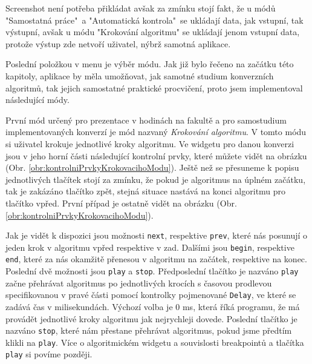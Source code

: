 Screenshot není potřeba přikládat avšak za zmínku stojí fakt, že u módů "Samostatná práce"\ a "Automatická kontrola"\ se ukládají data, jak vstupní, tak výstupní, avšak u módu "Krokování algoritmu" se ukládají jenom vstupní data, protože výstup zde netvoří uživatel, nýbrž samotná aplikace.


Poslední položkou v menu je výběr módu. Jak již bylo řečeno na začátku této kapitoly, aplikace by měla umožňovat, jak samotné studium konverzních algoritmů, tak jejich samostatné praktické procvičení, proto jsem implementoval následující módy.


První mód určený pro prezentace v hodinách na fakultě a pro samostudium implementovaných konverzí je mód nazvaný \textit{Krokování algoritmu}. V tomto módu si uživatel krokuje jednotlivé kroky algoritmu. Ve widgetu pro danou konverzi jsou v jeho horní části následující kontrolní prvky, které můžete vidět na obrázku (Obr. \ref{obr:kontrolniPrvkyKrokovacihoModu}). Ještě než se přesuneme k popisu jednotlivých tlačítek stojí za zmínku, že pokud je algoritmus na úplném začátku, tak je zakázáno tlačítko zpět, stejná situace nastává na konci algoritmu pro tlačítko vpřed. První případ je ostatně vidět na obrázku (Obr. \ref{obr:kontrolniPrvkyKrokovacihoModu}).


Jak je vidět k dispozici jsou možnosti \texttt{next}, respektive \texttt{prev}, které nás posunují o jeden krok v algoritmu vpřed respektive v zad. Dalšími jsou \texttt{begin}, respektive \texttt{end}, které za nás okamžitě přenesou v algoritmu na začátek, respektive na konec. Poslední dvě možnosti jsou \texttt{play} a \texttt{stop}. Předposlední tlačítko je nazváno \texttt{play} začne přehrávat algoritmus po jednotlivých krocích s časovou prodlevou specifikovanou v pravé části pomocí kontrolky pojmenované \texttt{Delay}, ve které se zadává čas v milisekundách. Výchozí volba je 0 ms, která říká programu, že má provádět jednotlivé kroky algoritmu jak nejrychleji dovede. Poslední tlačítko je nazváno \texttt{stop}, které nám přestane přehrávat algoritmus, pokud jsme předtím klikli na \texttt{play}. Více o algoritmickém widgetu a souvislosti breakpointů a tlačítka \texttt{play} si povíme později.


